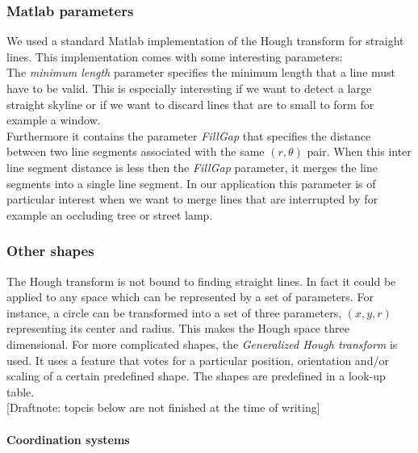 \subsubsection{Matlab parameters}
We used a standard Matlab implementation of the Hough transform for straight lines.  This implementation comes with some interesting parameters:\\

	The \emph{minimum length} parameter specifies the minimum length that a line must have to be valid. This is especially interesting if we want to detect a large straight skyline or if we want to discard lines that are to small to form for example a window.\\

	Furthermore it contains the parameter \emph{FillGap} that specifies the distance
	between two line segments associated with the same $(r, \theta)$ pair.
	When this inter line segment distance is less then the \emph{FillGap} parameter, it merges the line segments into a single line segment. In our application this parameter is of particular interest when we want to merge lines that are interrupted by for example an occluding tree or street lamp.\\


\subsubsection{Other shapes}
The Hough transform is not bound to finding straight lines. In fact it could be
applied to any space which can be represented by a set of parameters.  For
instance, a circle can be transformed into a set of three parameters, $(x,y,r)$
representing its center and radius. This makes the Hough space three
dimensional.  For more complicated shapes, the 
\emph{Generalized Hough transform} is used.
It uses a feature that votes for a particular position, orientation and/or scaling of a certain predefined shape.  The shapes are predefined in a look-up table.\\

[Draftnote: topcis below are not finished at the time of writing]
\paragraph{Coordination systems}


